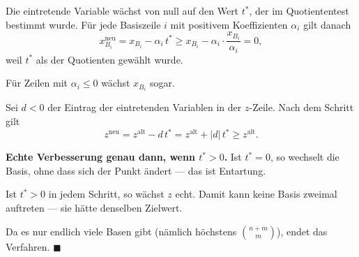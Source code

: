 \begin{merksatz}
Die eintretende Variable wächst von null auf den Wert $t^{*}$, der im Quotiententest bestimmt wurde. Für jede Basiszeile $i$ mit positivem Koeffizienten $\alpha_i$ gilt danach
\[ x_{B_i}^{\text{neu}} = x_{B_i} - \alpha_i\,t^{*} \ge x_{B_i} - \alpha_i\cdot\frac{x_{B_i}}{\alpha_i} = 0 , \]
weil $t^{*}$ als  der Quotienten gewählt wurde.

Für Zeilen mit $\alpha_i \le 0$ wächst $x_{B_i}$ sogar. \checkmark

Sei $d < 0$ der Eintrag der eintretenden Variablen in der $z$-Zeile. Nach dem Schritt gilt
\[ z^{\text{neu}} = z^{\text{alt}} - d\,t^{*} = z^{\text{alt}} + |d|\,t^{*} \ge z^{\text{alt}} . \]

\begin{center}
\begin{minipage}{0.9\textwidth}
\textbf{Echte Verbesserung genau dann, wenn $t^{*} > 0$.} Ist $t^{*} = 0$, so wechselt die Basis, ohne dass sich der Punkt ändert --- das ist Entartung.
\end{minipage}
\end{center}

Ist $t^{*} > 0$ in jedem Schritt, so wächst $z$ echt. Damit kann keine Basis zweimal auftreten --- sie hätte denselben Zielwert.

Da es nur endlich viele Basen gibt (nämlich höchstens $\binom{n+m}{m}$), endet das Verfahren. $\blacksquare$

\begin{center}
\begin{minipage}{0.88\textwidth}
\end{minipage}
\end{center}
\end{merksatz}

